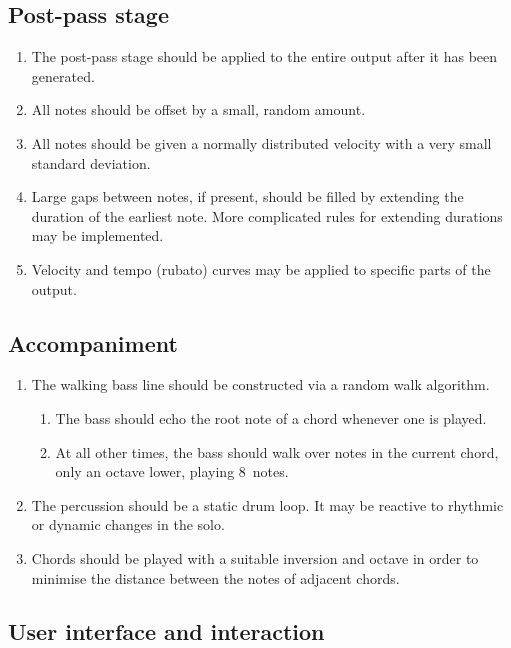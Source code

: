\subsection{Post-pass stage}

\begin{enumerate}[resume]
	\item The post-pass stage should be applied to the entire output after it has been generated.
	\item All notes should be offset by a small, random amount.
	\item All notes should be given a normally distributed velocity with a very small standard deviation.
	\item Large gaps between notes, if present, should be filled by extending the duration of the earliest note. More complicated rules for extending durations may be implemented.
	\item Velocity and tempo (rubato) curves may be applied to specific parts of the output.
\end{enumerate}

\subsection{Accompaniment}

\begin{enumerate}[resume]
	\item The walking bass line should be constructed via a random walk algorithm.
	\begin{enumerate}
		\item The bass should echo the root note of a chord whenever one is played.
		\item At all other times, the bass should walk over notes in the current chord, only an octave lower, playing 8\th\ notes.
	\end{enumerate}
	\item The percussion should be a static drum loop. It may be reactive to rhythmic or dynamic changes in the solo.
	\item Chords should be played with a suitable inversion and octave in order to minimise the distance between the notes of adjacent chords.
\end{enumerate}

\subsection{User interface and interaction}

